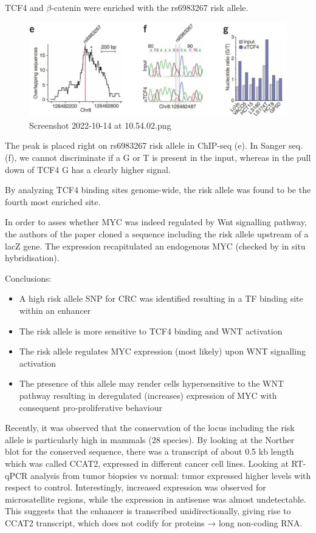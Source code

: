 TCF4 and $\beta$-catenin were enriched with the rs6983267 risk allele.

\begin{figure}
\centering
\includegraphics[width=\textwidth]{../_resources/Screenshot_2022-10-14_at_10-54-02.png}
\caption{Screenshot 2022-10-14 at 10.54.02.png}
\end{figure}

The peak is placed right on rs6983267 risk allele in ChIP-seq (e). In Sanger seq. (f), we cannot discriminate if a G or T is present in the input, whereas in the pull down of TCF4 G has a clearly higher signal.

By analyzing TCF4 binding sites genome-wide, the risk allele was found to be the fourth most enriched site.

In order to asses whether MYC was indeed regulated by Wnt signalling pathway, the authors of the paper cloned a sequence including the risk allele upstream of a lacZ gene. The expression recapitulated an endogenous MYC (checked by in situ hybridisation).

Conclusions:

\begin{itemize}
\tightlist
\item
  A high risk allele SNP for CRC was identified resulting in a TF binding site within an enhancer
\item
  The risk allele is more sensitive to TCF4 binding and WNT activation
\item
  The risk allele regulates MYC expression (most likely) upon WNT signalling activation
\item
  The presence of this allele may render cells hypersensitive to the WNT pathway resulting in deregulated (increases) expression of MYC with consequent pro-proliferative behaviour
\end{itemize}

Recently, it was observed that the conservation of the locus including the risk allele is particularly high in mammals (28 species). By looking at the Norther blot for the conserved sequence, there was a transcript of about 0.5 kb length which was called CCAT2, expressed in different cancer cell lines. Looking at RT-qPCR analysis from tumor biopsies vs normal: tumor expressed higher levels with respect to control. Interestingly, increased expression was observed for microsatellite regions, while the expression in antisense was almost undetectable. This suggests that the enhancer is transcribed unidirectionally, giving rise to CCAT2 transcript, which does not codify for proteins → long non-coding RNA.

